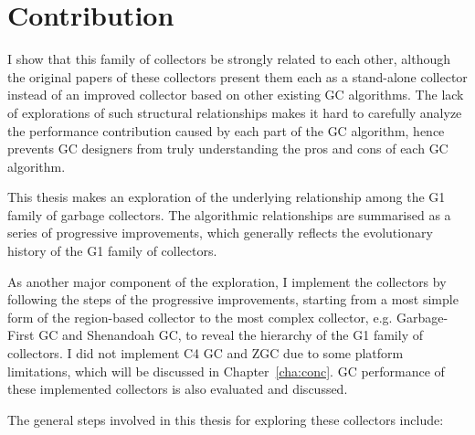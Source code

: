 

\section{Contribution}

I show that this family of collectors be strongly related to each other,
although the original papers of these collectors present them each as a stand-alone collector
instead of an improved collector based on other existing GC algorithms. The lack of
explorations of such structural relationships makes it hard to carefully analyze
the performance contribution caused by each part of the GC algorithm, hence prevents
GC designers from truly understanding the pros and cons of each GC algorithm.

This thesis makes an exploration of the underlying relationship among the
G1 family of garbage collectors. The algorithmic relationships are summarised
as a series of progressive improvements, which generally reflects the evolutionary
history of the G1 family of collectors.

As another major component of the exploration, I implement the collectors by following
the steps of the progressive improvements, starting from a most simple form of the
region-based collector to the most complex collector, e.g. Garbage-First GC and
Shenandoah GC, to reveal the hierarchy of the G1 family of collectors.
I did not implement C4 GC and ZGC due to some platform limitations, which will be
discussed in Chapter~\ref{cha:conc}.
GC performance of these implemented collectors is also evaluated and discussed.

The general steps involved in this thesis for exploring these collectors include:

